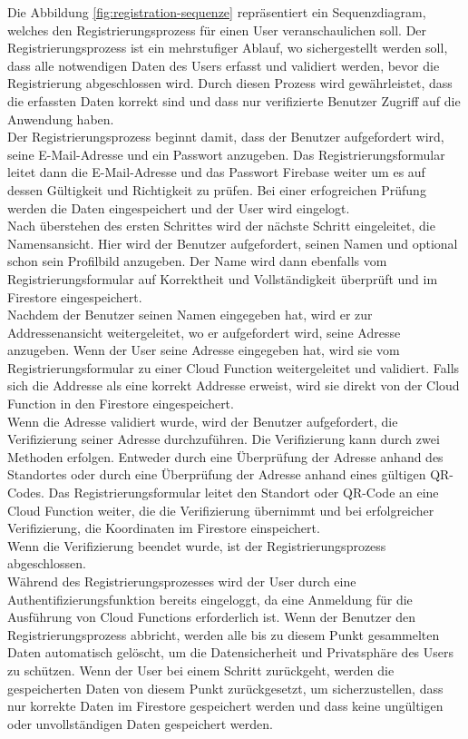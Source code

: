 Die Abbildung \ref{fig:registration-sequenze} repräsentiert ein Sequenzdiagram, welches den Registrierungsprozess für einen User veranschaulichen soll. Der Registrierungsprozess ist ein mehrstufiger Ablauf, wo sichergestellt werden soll, dass alle notwendigen Daten des Users erfasst und validiert werden, bevor die Registrierung abgeschlossen wird. Durch diesen Prozess wird gewährleistet, dass die erfassten Daten korrekt sind und dass nur verifizierte Benutzer Zugriff auf die Anwendung haben.
\\
Der Registrierungsprozess beginnt damit, dass der Benutzer aufgefordert wird, seine E-Mail-Adresse und ein Passwort anzugeben. Das Registrierungsformular leitet dann die E-Mail-Adresse und das Passwort Firebase weiter um es auf dessen Gültigkeit und Richtigkeit zu prüfen. Bei einer erfogreichen Prüfung werden die Daten eingespeichert und der User wird eingelogt.
\\
Nach überstehen des ersten Schrittes wird der nächste Schritt eingeleitet, die Namensansicht. Hier wird der Benutzer aufgefordert, seinen Namen und optional schon sein Profilbild anzugeben. Der Name wird dann ebenfalls vom Registrierungsformular auf Korrektheit und Vollständigkeit überprüft und im Firestore eingespeichert.
\\
Nachdem der Benutzer seinen Namen eingegeben hat, wird er zur Addressenansicht weitergeleitet, wo er aufgefordert wird, seine Adresse anzugeben. Wenn der User seine Adresse eingegeben hat, wird sie vom Registrierungsformular zu einer Cloud Function weitergeleitet und validiert. Falls sich die Addresse als eine korrekt Addresse erweist, wird sie direkt von der Cloud Function in den Firestore eingespeichert.
\\
Wenn die Adresse validiert wurde, wird der Benutzer aufgefordert, die Verifizierung seiner Adresse durchzuführen. Die Verifizierung kann durch zwei Methoden erfolgen. Entweder durch eine Überprüfung der Adresse anhand des Standortes oder durch eine Überprüfung der Adresse anhand eines gültigen QR-Codes. Das Registrierungsformular leitet den Standort oder QR-Code an eine Cloud Function weiter, die die Verifizierung übernimmt und bei erfolgreicher Verifizierung, die Koordinaten im Firestore einspeichert.
\\
Wenn die Verifizierung beendet wurde, ist der Registrierungsprozess abgeschlossen.
\\
Während des Registrierungsprozesses wird der User durch eine Authentifizierungsfunktion bereits eingeloggt, da eine Anmeldung für die Ausführung von Cloud Functions erforderlich ist. Wenn der Benutzer den Registrierungsprozess abbricht, werden alle bis zu diesem Punkt gesammelten Daten automatisch gelöscht, um die Datensicherheit und Privatsphäre des Users zu schützen. Wenn der User bei einem Schritt zurückgeht, werden die gespeicherten Daten von diesem Punkt zurückgesetzt, um sicherzustellen, dass nur korrekte Daten im Firestore gespeichert werden und dass keine ungültigen oder unvollständigen Daten gespeichert werden.

